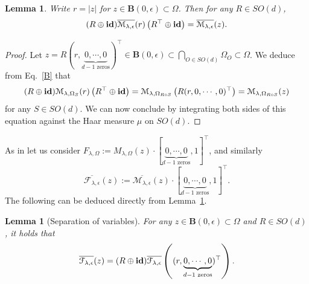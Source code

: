 \documentclass[11pt,a4paper,english,reqno]{amsart}
\theoremstyle{plain}
\newtheorem{lemma}[definition]{Lemma}
\newcommand{\e}{\epsilon}
\newcommand{\1}{\mathbbm{1}}
\newcommand{\B}{\mathbf{B}}
\begin{document}
\begin{lemma}\label{Lemma_M_bar}
Write $r=|z|$ for $z \in \B(0,\e) \subset \Omega$. Then for any $R \in SO(d)$,
\begin{equation}\label{C}
(R \oplus {\bf id})   \overline{{\mathcal{M}}_{\lambda,\e}}(r) \left(R^{\top} \oplus {\bf id}\right) = \overline{\mathcal{M}_{\lambda,\e}}(z).
\end{equation}
\end{lemma}


\begin{proof}
Let $z = R (r, \underbrace{0, \cdots, 0}_{d-1 \text{ zeros}})^{\top}\in \B(0,\e) \subset \bigcap_{O \in SO(d)}\Omega_O \subset \Omega$. We deduce from Eq.~\eqref{B} that 
\begin{equation*}
(R \oplus {\bf id}) \mathcal{M}_{\lambda, \Omega_{S}}(r)\left(R^{\top} \oplus {\bf id}\right) = \mathcal{M}_{\lambda, \Omega_{R\circ S}}\left(R(r, 0, \cdots, 0)^{\top}\right) = \mathcal{M}_{\lambda, \Omega_{R\circ S}}(z)
\end{equation*}
for any $S \in SO(d)$. We can now conclude by integrating both sides of  this equation against the Haar measure $\mu$ on $SO(d)$.   
\end{proof}




As in \cite{boedihardjo2021expected} let us consider $
    F_{\lambda, \Omega} := M_{\lambda, \Omega}(z) \cdot [\underbrace{0,\cdots, 0}_{d-1\text{ zeros}},1]^\top$, and similarly
\begin{equation}\label{F and M}
\overline{\mathcal{F}_{\lambda,\e}}(z) := \overline{\mathcal{M}_{\lambda,\e}}(z)\cdot [\underbrace{0,\cdots, 0}_{d-1\text{ zeros}},1]^\top.
\end{equation}
The following can be deduced directly from Lemma~\ref{Lemma_M_bar}.
\begin{lemma}[Separation of variables]\label{Lemma_F_bar}
For any $z \in \B(0,\e) \subset \Omega$ and $R \in SO(d)$, it holds that
\begin{equation}\label{eqn_F_bar}
\overline{\mathcal{F}_{\lambda,\e}}(z) =
(R \oplus {\bf id})   \overline{{\mathcal{F}}_{\lambda,\e}}\left( (r, \underbrace{0, \cdots, 0}_{d-1 \text{ zeros}})^{\top}\right).
\end{equation}
\end{lemma}
\end{document}
